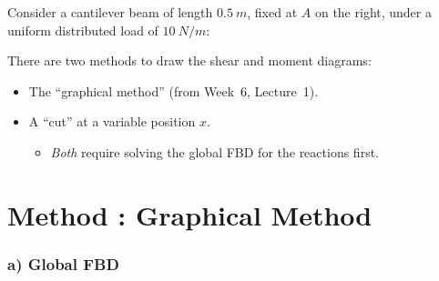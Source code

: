 \documentclass[11pt]{article}
\begin{document}

\noindent
Consider a cantilever beam of length $\SI{0.5}{m}$, fixed at $A$ on the right,
under a uniform distributed load of $\SI{10}{N/m}$:

\begin{center}
\end{center}

\noindent
There are two methods to draw the shear and moment diagrams:
\begin{itemize}[label={}, leftmargin=2.5em]
  \item[\circnum{1}] The ``graphical method'' (from Week~6, Lecture~1).
  \item[\circnum{2}] A ``cut'' at a variable position $x$.
  \begin{itemize}[label=\then]
    \item \emph{Both} require solving the global FBD for the reactions first.
  \end{itemize}
\end{itemize}

\section*{Method \protect{}: Graphical Method}

\subsubsection*{a) Global FBD}
\end{document}
